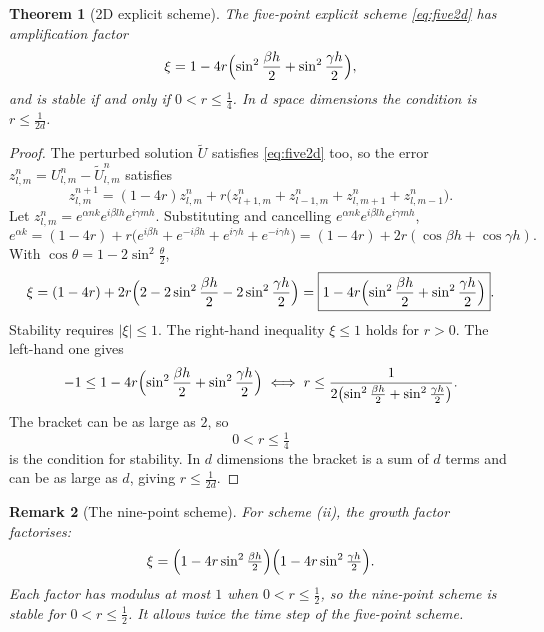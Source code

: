 \documentclass[11pt,a4paper]{article}
\numberwithin{equation}{section}
\theoremstyle{spacedplain}
\newtheorem{theorem}{Theorem}[section]
\theoremstyle{spaceddefinition}
\theoremstyle{spacedremark}
\newtheorem{remark}[theorem]{Remark}
\begin{document}
\begin{keybox}
\begin{theorem}[2D explicit scheme]\label{thm:vn2d}
The five-point explicit scheme \eqref{eq:five2d} has amplification
factor
\[
  \xi=1-4r\Bigl(\sin^2\frac{\beta h}2+\sin^2\frac{\gamma h}2\Bigr),
\]
and is stable if and only if \(0<r\le\frac14\).  In \(d\) space
dimensions the condition is \(r\le\frac1{2d}\).
\end{theorem}
\end{keybox}

\begin{proof}
The perturbed solution \(\widetilde U\) satisfies \eqref{eq:five2d}
too, so the error \(z_{l,m}^n=U_{l,m}^n-\widetilde U_{l,m}^n\)
satisfies
\[
  z_{l,m}^{n+1}=(1-4r)z_{l,m}^n
  +r\bigl(z_{l+1,m}^n+z_{l-1,m}^n+z_{l,m+1}^n+z_{l,m-1}^n\bigr).
\]
Let \(z_{l,m}^n=e^{\alpha nk}e^{i\beta lh}e^{i\gamma mh}\).  Substituting
and cancelling \(e^{\alpha nk}e^{i\beta lh}e^{i\gamma mh}\),
\[
  e^{\alpha k}
  =(1-4r)+r\bigl(e^{i\beta h}+e^{-i\beta h}+e^{i\gamma h}+e^{-i\gamma h}\bigr)
  =(1-4r)+2r(\cos\beta h+\cos\gamma h).
\]
With \(\cos\theta=1-2\sin^2\frac\theta2\),
\[
  \xi=(1-4r)+2r\Bigl(2-2\sin^2\frac{\beta h}2-2\sin^2\frac{\gamma h}2\Bigr)
  =\boxed{1-4r\Bigl(\sin^2\frac{\beta h}2+\sin^2\frac{\gamma h}2\Bigr)}.
\]
Stability requires \(|\xi|\le1\).  The right-hand inequality
\(\xi\le1\) holds for \(r>0\).  The left-hand one gives
\[
  -1\le1-4r\Bigl(\sin^2\frac{\beta h}2+\sin^2\frac{\gamma h}2\Bigr)
  \iff
  r\le\frac1{2\bigl(\sin^2\frac{\beta h}2+\sin^2\frac{\gamma h}2\bigr)}.
\]
The bracket can be as large as \(2\), so
\[
  \boxed{0<r\le\tfrac14}
\]
is the condition for stability.  In \(d\) dimensions the bracket is a
sum of \(d\) terms and can be as large as \(d\), giving
\(r\le\frac1{2d}\).
\end{proof}

\begin{remark}[The nine-point scheme]
For scheme (ii), the growth factor factorises:
\[
  \xi=\Bigl(1-4r\sin^2\tfrac{\beta h}2\Bigr)\Bigl(1-4r\sin^2\tfrac{\gamma h}2\Bigr).
\]
Each factor has modulus at most \(1\) when \(0<r\le\frac12\), so the
nine-point scheme is stable for \(0<r\le\frac12\).  It allows twice the
time step of the five-point scheme.
\end{remark}
\end{document}
